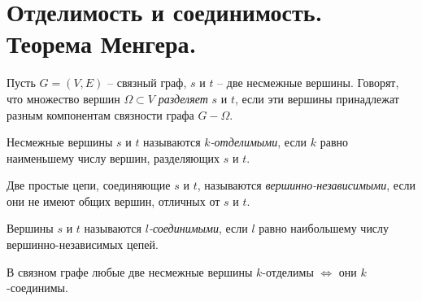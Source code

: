 \section{Отделимость и соединимость. Теорема Менгера.}

\begin{definition}
    Пусть $ G = (V,E) $ -- связный граф, $ s $ и $ t $ -- две несмежные вершины. Говорят, что множество вершин $ \Omega \subset V $ \emph{разделяет} $ s $ и $ t $, если эти вершины принадлежат разным компонентам связности графа $ G - \Omega $.
\end{definition}

\begin{definition}
    Несмежные вершины $ s $ и $ t $ называются \emph{$ k $-отделимыми}, если $ k $ равно наименьшему числу вершин, разделяющих $ s $ и $ t $.
\end{definition}

\begin{definition}
    Две простые цепи, соединяющие $ s $ и $ t $, называются \emph{вершинно-независимыми}, если они не имеют общих вершин, отличных от $ s $ и $ t $.
\end{definition}

\begin{definition}
    Вершины $ s $ и $ t $ называются \emph{$ l $-соединимыми}, если $ l $ равно наибольшему числу вершинно-независимых цепей.
\end{definition}

\begin{theorem}[Менгер]
    В связном графе любые две несмежные вершины $ k $-отделимы $ \iff $ они $ k $-соединимы.
\end{theorem}


